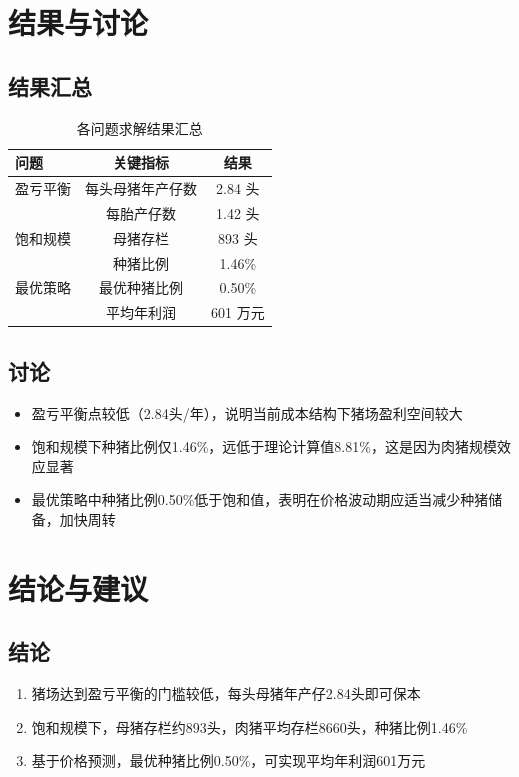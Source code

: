 \documentclass[12pt,a4paper]{article}
\begin{document}
\section{结果与讨论}

\subsection{结果汇总}

\begin{table}[H]
\centering
\caption{各问题求解结果汇总}
\begin{tabular}{lcc}
\toprule
\textbf{问题} & \textbf{关键指标} & \textbf{结果} \\
\midrule
盈亏平衡 & 每头母猪年产仔数 & 2.84 头 \\
 & 每胎产仔数 & 1.42 头 \\
饱和规模 & 母猪存栏 & 893 头 \\
 & 种猪比例 & 1.46\% \\
最优策略 & 最优种猪比例 & 0.50\% \\
 & 平均年利润 & 601 万元 \\
\bottomrule
\end{tabular}
\end{table}

\subsection{讨论}
\begin{itemize}
    \item 盈亏平衡点较低（2.84头/年），说明当前成本结构下猪场盈利空间较大
    \item 饱和规模下种猪比例仅1.46\%，远低于理论计算值8.81\%，这是因为肉猪规模效应显著
    \item 最优策略中种猪比例0.50\%低于饱和值，表明在价格波动期应适当减少种猪储备，加快周转
\end{itemize}

\section{结论与建议}

\subsection{结论}
\begin{enumerate}
    \item 猪场达到盈亏平衡的门槛较低，每头母猪年产仔2.84头即可保本
    \item 饱和规模下，母猪存栏约893头，肉猪平均存栏8660头，种猪比例1.46\%
    \item 基于价格预测，最优种猪比例0.50\%，可实现平均年利润601万元
\end{enumerate}
\end{document}

